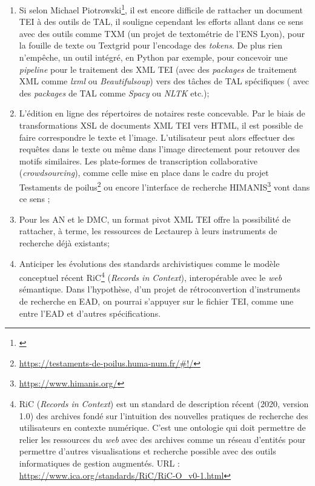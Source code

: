 \begin{enumerate}
    \item Si selon Michael Piotrowski\footnote{\cite{romary_natural_2014}}, il est encore difficile de rattacher un document TEI à des outils de TAL, il souligne cependant les efforts allant dans ce sens avec des outils comme TXM (un projet de textométrie de l'ENS Lyon), pour la fouille de texte ou Textgrid pour l'encodage des \textit{tokens}. De plus rien n'empêche, un outil intégré, en Python par exemple, pour concevoir une \textit{pipeline} pour le traitement des XML TEI (avec des \textit{packages} de traitement XML comme \textit{lxml} ou \textit{Beautifulsoup}) vers des tâches de TAL spécifiques ( avec des \textit{packages} de TAL comme \textit{Spacy} ou \textit{NLTK} etc.);\\
    \item L'édition en ligne des répertoires de notaires reste concevable. Par le biais de transformations XSL de documents XML TEI vers HTML, il est possible de faire correspondre le texte et l'image. L'utilisateur peut alors effectuer des requêtes dans le texte ou même dans l'image directement pour retouver des motifs similaires.  Les plate-formes de transcription collaborative (\textit{crowdsourcing}), comme celle mise en place dans le cadre du projet Testaments de poilus\footnote{\url{https://testaments-de-poilus.huma-num.fr/\#!/}} ou encore l'interface de recherche HIMANIS\footnote{\url{https://www.himanis.org/}} vont dans ce sens ;\\
    \item Pour les AN et le DMC, un format pivot XML TEI offre la possibilité de rattacher, à terme, les ressources de Lectaurep à leurs instruments de recherche déjà existants;
    \item Anticiper les évolutions des standards archivistiques comme le modèle conceptuel récent RiC\footnote{RiC (\textit{Records in Context}) est un standard de description récent (2020, version 1.0) des archives fondé sur l'intuition des nouvelles pratiques de recherche des utilisateurs en contexte numérique. C'est une ontologie qui doit permettre de relier les ressources du \textit{web} avec des archives comme un réseau d'entités pour permettre d'autres visualisations et recherche possible avec des outils informatiques de gestion augmentés. URL : \url{https://www.ica.org/standards/RiC/RiC-O_v0-1.html}} (\textit{Records in Context}), interopérable avec le \textit{web} sémantique. Dans l'hypothèse, d'un projet de rétroconvertion d'instruments de recherche en EAD, on pourrai s'appuyer sur le fichier TEI, comme une  entre l'EAD et d'autres spécifications.
\end{enumerate}
